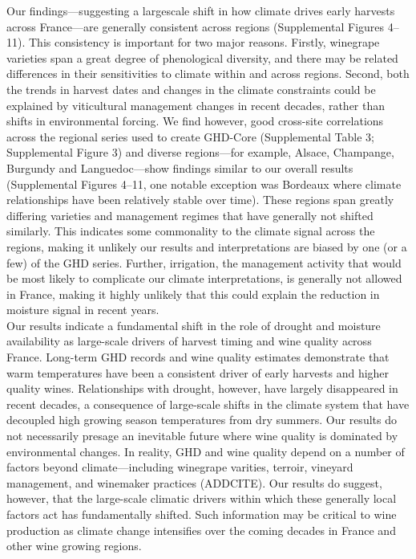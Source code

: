 \documentclass[final]{nature}
\begin{document}
\indent Our findings---suggesting a largescale shift in how climate drives early harvests across France---are generally consistent across regions (Supplemental Figures 4--11).  This consistency is important for two major reasons. Firstly, winegrape varieties span a great degree of phenological diversity, and there may be related differences in their sensitivities to climate within and across regions\cite{Parker2013}. Second, both the trends in harvest dates and changes in the climate constraints could be explained by viticultural management changes in recent decades, rather than shifts in environmental forcing. We find however, good cross-site correlations across the regional series used to create GHD-Core (Supplemental Table 3; Supplemental Figure 3) and diverse regions---for example, Alsace, Champange, Burgundy and Languedoc---show findings similar to our overall results (Supplemental Figures 4--11, one notable exception was Bordeaux where climate relationships have been relatively stable over time). These regions span greatly differing varieties and management regimes that have generally not shifted similarly. This indicates some commonality to the climate signal across the regions, making it unlikely our results and interpretations are biased by one (or a few) of the GHD series. Further, irrigation, the management activity that would be most likely to complicate our climate interpretations, is generally not allowed in France, making it highly unlikely that this could explain the reduction in moisture signal in recent years.\\
\indent Our results indicate a fundamental shift in the role of drought and moisture availability as large-scale drivers of harvest timing and wine quality across France. Long-term GHD records and wine quality estimates demonstrate that warm temperatures have been a consistent driver of early harvests and higher quality wines. Relationships with drought, however, have largely disappeared in recent decades, a consequence of large-scale shifts in the climate system that have decoupled high growing season temperatures from dry summers. Our results do not necessarily presage an inevitable future where wine quality is dominated by environmental changes. In reality, GHD and wine quality depend on a number of factors beyond climate---including winegrape varities, terroir, vineyard management, and winemaker practices (ADDCITE). Our results do suggest, however, that the large-scale climatic drivers within which these generally local factors act has fundamentally shifted. Such information may be critical to wine production as climate change intensifies over the coming decades in France and other wine growing regions.
\end{document}
